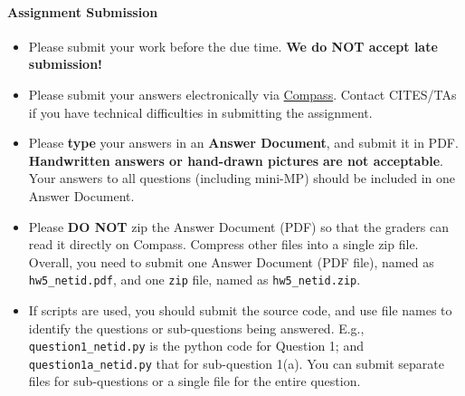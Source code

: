 \paragraph*{Assignment Submission}
\begin{itemize}\vspace{-2mm}\setlength\itemsep{0mm}
	\setlength{\itemsep}{2pt}
	\item Please submit your work before the due time. \textbf{We do NOT accept late submission!}
	\item 
	Please submit your answers electronically via  \href{http://compass2g.illinois.edu}{Compass}. Contact CITES/TAs if you have technical difficulties in submitting the assignment.
	\item Please {\bf type} your answers in an \textbf{Answer Document}, and submit it in PDF. \textbf{Handwritten answers or hand-drawn pictures} \textbf{are not acceptable}. Your answers to all questions (including mini-MP) should be included in one Answer Document.
	\item Please \textbf{DO NOT} zip the Answer Document (PDF) so that the graders can read it directly on Compass.  
	Compress other files into a single zip file. Overall, you need to submit one Answer Document (PDF file), named as \texttt{hw5\_netid.pdf}, and one \texttt{zip} file, named as \texttt{hw5\_netid.zip}.
	\item If scripts are used, you should submit the source code, and use file names to identify the questions or sub-questions being answered. E.g., \texttt{question1\_netid.py} is the python code for Question 1; and \texttt{question1a\_netid.py} that for sub-question 1(a). You can submit separate files for sub-questions or a single file for the entire question. 
\end{itemize}




